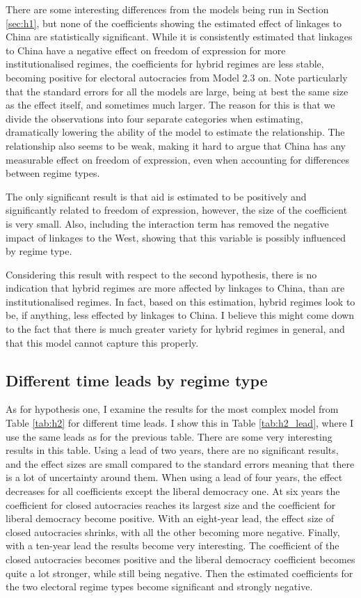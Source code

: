 There are some interesting differences from the models being run in Section \ref{sec:h1}, but none of the coefficients showing the estimated effect of linkages to China are statistically significant. While it is consistently estimated that linkages to China have a negative effect on freedom of expression for more institutionalised regimes, the coefficients for hybrid regimes are less stable, becoming positive for electoral autocracies from Model 2.3 on. Note particularly that the standard errors for all the models are large, being at best the same size as the effect itself, and sometimes much larger. The reason for this is that we divide the observations into four separate categories when estimating, dramatically lowering the ability of the model to estimate the relationship. The relationship also seems to be weak, making it hard to argue that China has any measurable effect on freedom of expression, even when accounting for differences between regime types.

The only significant result is that aid is estimated to be positively and significantly related to freedom of expression, however, the size of the coefficient is very small. Also, including the interaction term has removed the negative impact of linkages to the West, showing that this variable is possibly influenced by regime type. 

Considering this result with respect to the second hypothesis, there is no indication that hybrid regimes are more affected by linkages to China, than are institutionalised regimes. In fact, based on this estimation, hybrid regimes look to be, if anything, less effected by linkages to China. I believe this might come down to the fact that there is much greater variety for hybrid regimes in general, and that this model cannot capture this properly.

\subsection{Different time leads by regime type}
As for hypothesis one, I examine the results for the most complex model from Table \ref{tab:h2} for different time leads. I show this in Table \ref{tab:h2_lead}, where I use the same leads as for the previous table. There are some very interesting results in this table. Using a lead of two years, there are no significant results, and the effect sizes are small compared to the standard errors meaning that there is a lot of uncertainty around them. When using a lead of four years, the effect decreases for all coefficients except the liberal democracy one. At six years the coefficient for closed autocracies reaches its largest size and the coefficient for liberal democracy become positive. With an eight-year lead, the effect size of closed autocracies shrinks, with all the other becoming more negative. Finally, with a ten-year lead the results become very interesting. The coefficient of the closed autocracies becomes positive and the liberal democracy coefficient becomes quite a lot stronger, while still being negative. Then the estimated coefficients for the two electoral regime types become significant and strongly negative.

